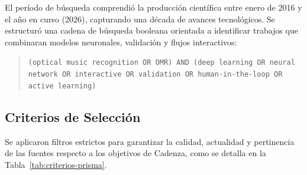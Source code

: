 \documentclass[conference]{IEEEtran}
\begin{document}
El período de búsqueda comprendió la producción científica entre enero de 2016 y el año en curso (2026), capturando una década de avances tecnológicos. Se estructuró una cadena de búsqueda booleana orientada a identificar trabajos que combinaran modelos neuronales, validación y flujos interactivos:

\begin{quote}
\footnotesize\raggedright
\texttt{(\textquotedbl optical music recognition\textquotedbl{} OR \textquotedbl OMR\textquotedbl) AND (\textquotedbl deep learning\textquotedbl{} OR \textquotedbl neural network\textquotedbl{} OR \textquotedbl interactive\textquotedbl{} OR \textquotedbl validation\textquotedbl{} OR \textquotedbl human-in-the-loop\textquotedbl{} OR \textquotedbl active learning\textquotedbl)}
\end{quote}

\subsection{Criterios de Selección}
\label{sec:criterios-seleccion}

Se aplicaron filtros estrictos para garantizar la calidad, actualidad y pertinencia de las fuentes respecto a los objetivos de Cadenza, como se detalla en la Tabla~\ref{tab:criterios-prisma}.
\end{document}
